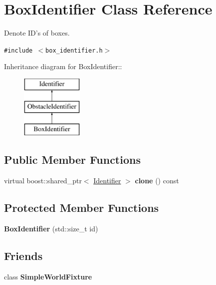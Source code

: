 \hypertarget{class_box_identifier}{
\section{BoxIdentifier Class Reference}
\label{class_box_identifier}
}
Denote ID's of boxes.  


{\tt \#include $<$box\_\-identifier.h$>$}

Inheritance diagram for BoxIdentifier::\begin{figure}[H]
\begin{center}
\leavevmode
\includegraphics[height=3cm]{class_box_identifier}
\end{center}
\end{figure}
\subsection*{Public Member Functions}
\begin{CompactItemize}
\item 
\hypertarget{class_box_identifier_b8201316d04af5dc947777677a68f53f}{
virtual boost::shared\_\-ptr$<$ \hyperlink{class_identifier}{Identifier} $>$ \textbf{clone} () const }
\label{class_box_identifier_b8201316d04af5dc947777677a68f53f}

\end{CompactItemize}
\subsection*{Protected Member Functions}
\begin{CompactItemize}
\item 
\hypertarget{class_box_identifier_da0b4ca636866324333b732697963d20}{
\textbf{BoxIdentifier} (std::size\_\-t id)}
\label{class_box_identifier_da0b4ca636866324333b732697963d20}

\end{CompactItemize}
\subsection*{Friends}
\begin{CompactItemize}
\item 
\hypertarget{class_box_identifier_6433c824d5e64fc5b3635b2a0f2af16c}{
class \textbf{SimpleWorldFixture}}
\label{class_box_identifier_6433c824d5e64fc5b3635b2a0f2af16c}

\end{CompactItemize}


